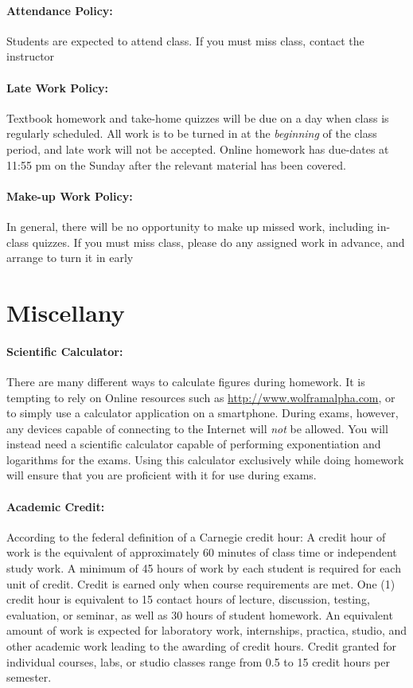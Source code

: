 \documentclass[12pt, letterpaper]{article}
\begin{document}
\paragraph{Attendance Policy:}
Students are expected to attend class. If you must miss class, contact the instructor

\paragraph{Late Work Policy:}
Textbook homework and take-home quizzes will be due on a day when class is regularly scheduled. All work is to be turned in at the \emph{beginning} of the class period, and late work will not be accepted. Online homework has due-dates at 11:55 pm on the Sunday after the relevant material has been covered.

\paragraph{Make-up Work Policy:}
In general, there will be no opportunity to make up missed work, including in-class quizzes. If you must miss class, please do any assigned work in advance, and arrange to turn it in early

\section*{Miscellany}

\paragraph{Scientific Calculator:}
There are many different ways to calculate figures during homework. It is tempting to rely on Online resources such as \href{http://www.wolframalpha.com}{http://www.wolframalpha.com}, or to simply use a calculator application on a smartphone. During exams, however, any devices capable of connecting to the Internet will \emph{not} be allowed. You will instead need a scientific calculator capable of performing exponentiation and logarithms for the exams. Using this calculator exclusively while doing homework will ensure that you are proficient with it for use during exams.

\paragraph{Academic Credit:}
According to the federal definition of a Carnegie credit hour: A credit hour of work is the equivalent of approximately 60 minutes of class time or independent study work. A minimum of 45 hours of work by each student is required for each unit of credit. Credit is earned only when course requirements are met. One (1) credit hour is equivalent to 15 contact hours of lecture, discussion, testing, evaluation, or seminar, as well as 30 hours of student homework. An equivalent amount of work is expected for laboratory work, internships, practica, studio, and other academic work leading to the awarding of credit hours. Credit granted for individual courses, labs, or studio classes range from 0.5 to 15 credit hours per semester.
\end{document}
